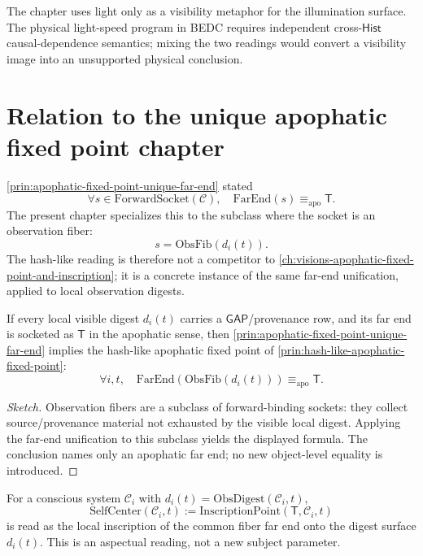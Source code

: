 \begin{remark}
\label{rem:hash-like-light-two-uses}
The chapter uses light only as a visibility metaphor for the illumination surface. The physical light-speed program in BEDC requires independent cross-$\mathsf{Hist}$ causal-dependence semantics; mixing the two readings would convert a visibility image into an unsupported physical conclusion.
\end{remark}

\section{Relation to the unique apophatic fixed point chapter}
\label{sec:hash-like-relation-to-previous}

\autoref{prin:apophatic-fixed-point-unique-far-end} stated
$$
\forall s \in \mathrm{ForwardSocket}(\mathcal{C}),\quad \mathrm{FarEnd}(s) \equiv_{\mathrm{apo}} \mathsf{T}.
$$
The present chapter specializes this to the subclass where the socket is an observation fiber:
$$
s = \mathrm{ObsFib}(d_i(t)).
$$
The hash-like reading is therefore not a competitor to \autoref{ch:visions-apophatic-fixed-point-and-inscription}; it is a concrete instance of the same far-end unification, applied to local observation digests.

\begin{theorem}
\label{thm:hash-like-specialization}
If every local visible digest $d_i(t)$ carries a $\mathsf{GAP}$/provenance row, and its far end is socketed as $\mathsf{T}$ in the apophatic sense, then \autoref{prin:apophatic-fixed-point-unique-far-end} implies the hash-like apophatic fixed point of \autoref{prin:hash-like-apophatic-fixed-point}:
$$
\forall i, t,\quad \mathrm{FarEnd}(\mathrm{ObsFib}(d_i(t))) \equiv_{\mathrm{apo}} \mathsf{T}.
$$
\end{theorem}

\begin{proof}[Sketch]
Observation fibers are a subclass of forward-binding sockets: they collect source/provenance material not exhausted by the visible local digest. Applying the far-end unification to this subclass yields the displayed formula. The conclusion names only an apophatic far end; no new object-level equality is introduced.
\end{proof}

\begin{corollary}
\label{cor:hash-like-self-center-on-digest}
For a conscious system $\mathcal{C}_i$ with $d_i(t) = \mathrm{ObsDigest}(\mathcal{C}_i, t)$,
$$
\mathrm{SelfCenter}(\mathcal{C}_i, t) := \mathrm{InscriptionPoint}(\mathsf{T}, \mathcal{C}_i, t)
$$
is read as the local inscription of the common fiber far end onto the digest surface $d_i(t)$. This is an aspectual reading, not a new subject parameter.
\end{corollary}

